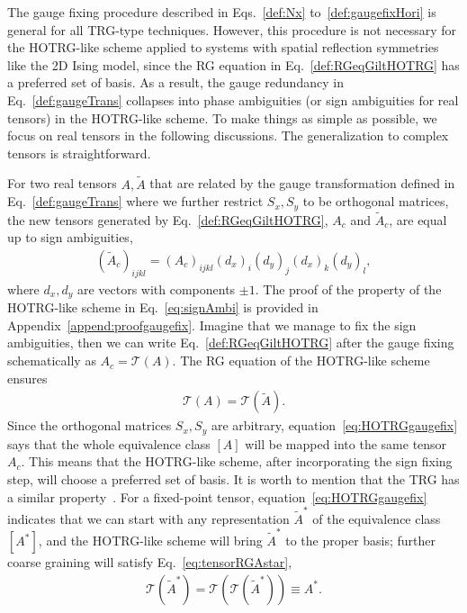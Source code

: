 \documentclass[aps,prr,reprint,superscriptaddress,nofootinbib,floatfix]{revtex4-2}
\begin{document}
The gauge fixing procedure described in Eqs.~\eqref{def:Nx} to~\eqref{def:gaugefixHori} is general for all TRG-type techniques.
However, this procedure is not necessary for the HOTRG-like scheme applied to systems with spatial reflection symmetries like the 2D Ising model, since the RG equation in Eq.~\eqref{def:RGeqGiltHOTRG} has a preferred set of basis.
As a result, the gauge redundancy in Eq.~\eqref{def:gaugeTrans} collapses into phase ambiguities (or sign ambiguities for real tensors) in the HOTRG-like scheme\@.
To make things as simple as possible, we focus on real tensors in the following discussions.
The generalization to complex tensors is straightforward.
%

For two real tensors $A, \tilde{A}$ that are related by the gauge transformation defined in Eq.~\eqref{def:gaugeTrans} where we further restrict $S_x,S_y$ to be orthogonal matrices, the new tensors generated by Eq.~\eqref{def:RGeqGiltHOTRG}, $A_c$ and $ \tilde{A}_c$, are equal up to sign ambiguities,
%
\begin{align}\label{eq:signAmbi}
    \left(\tilde{A}_c \right)_{ijkl} =
    \left(A_c\right)_{ijkl}(d_x)_i (d_y)_j (d_x)_k (d_y)_l, 
\end{align}
%
where $d_x,d_y$ are vectors with components $\pm 1$. 
The proof of the property of the HOTRG-like scheme in Eq.~\eqref{eq:signAmbi} is provided in Appendix~\ref{append:proofgaugefix}.
Imagine that we manage to fix the sign ambiguities, then we can write Eq.~\eqref{def:RGeqGiltHOTRG} after the gauge fixing schematically as $A_c = \mathcal{T}(A)$. The RG equation of the HOTRG-like scheme ensures
%
\begin{align}\label{eq:HOTRGgaugefix}
    \mathcal{T}(A) = \mathcal{T}(\tilde{A}).
\end{align}
%
Since the orthogonal matrices $S_x, S_y$ are arbitrary, equation~\eqref{eq:HOTRGgaugefix} says that the whole equivalence class $[A]$ will be mapped into the same tensor $A_c$. 
This means that the HOTRG-like scheme, after incorporating the sign fixing step, will choose a preferred set of basis. 
It is worth to mention that the TRG has a similar property~\cite{kadanoff2014}.
For a fixed-point tensor, equation~\eqref{eq:HOTRGgaugefix} indicates that we can start with any representation $\tilde{A}^*$ of the equivalence class $[A^*]$, and the HOTRG-like scheme will bring $\tilde{A}^*$ to the proper basis; further coarse graining will satisfy Eq.~\eqref{eq:tensorRGAstar},
%
\begin{align}\label{eq:GiltHOTRGfixT}
    \mathcal{T}(\tilde{A}^*) =
    \mathcal{T}\left(\mathcal{T}(\tilde{A}^*)  \right) \equiv A^*.
\end{align}
%
\end{document}
